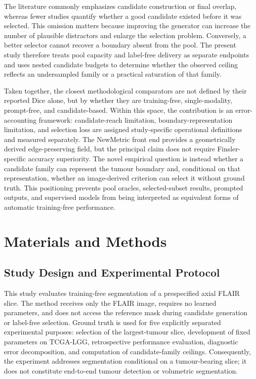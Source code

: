 \documentclass[11pt,a4paper]{article}
\begin{document}
The literature commonly emphasizes candidate construction or final overlap,
whereas fewer studies quantify whether a good candidate existed before it was
selected. This omission matters because improving the generator can increase the
number of plausible distractors and enlarge the selection problem. Conversely, a
better selector cannot recover a boundary absent from the pool. The present study
therefore treats pool capacity and label-free delivery as separate endpoints and
uses nested candidate budgets to determine whether the observed ceiling reflects
an undersampled family or a practical saturation of that family.

Taken together, the closest methodological comparators are not defined by their reported
Dice alone, but by whether they are training-free, single-modality, prompt-free,
and candidate-based. Within this space, the contribution is an error-accounting
framework: candidate-reach limitation, boundary-representation limitation, and
selection loss are assigned study-specific operational definitions and measured separately. The
NewMetric front end provides a geometrically derived edge-preserving field, but
the principal claim does not require Finsler-specific accuracy superiority. The
novel empirical question is instead whether a candidate family can represent the
tumour boundary and, conditional on that representation, whether an image-derived
criterion can select it without ground truth. This positioning prevents pool
oracles, selected-subset results, prompted outputs, and supervised models from
being interpreted as equivalent forms of automatic training-free performance.

\section{Materials and Methods}\label{sec:methods}

\subsection{Study Design and Experimental Protocol}\label{sec:study-design}

This study evaluates training-free segmentation of a prespecified axial FLAIR
slice. The method receives only the FLAIR image, requires no learned parameters,
and does not access the reference mask during candidate generation or label-free
selection. Ground truth is used for five explicitly separated experimental
purposes: selection of the largest-tumour slice, development of fixed parameters
on TCGA-LGG, retrospective performance evaluation, diagnostic error
decomposition, and computation of candidate-family ceilings. Consequently, the
experiment addresses segmentation conditional on a tumour-bearing slice; it does
not constitute end-to-end tumour detection or volumetric segmentation.
\end{document}
